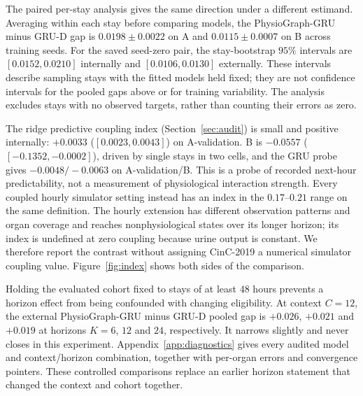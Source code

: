The paired per-stay analysis gives the same direction under a different estimand. Averaging within each stay before comparing models, the PhysioGraph-GRU minus GRU-D gap is $0.0198\pm0.0022$ on A and $0.0115\pm0.0007$ on B across training seeds. For the saved seed-zero pair, the stay-bootstrap $95\%$ intervals are $[0.0152,0.0210]$ internally and $[0.0106,0.0130]$ externally. These intervals describe sampling stays with the fitted models held fixed; they are not confidence intervals for the pooled gaps above or for training variability. The analysis excludes stays with no observed targets, rather than counting their errors as zero.


The ridge predictive coupling index (Section~\ref{sec:audit}) is small and positive internally: $+0.0033$ ($[0.0023,\allowbreak 0.0043]$) on A-validation. B is $-0.0557$ ($[-0.1352,\allowbreak -0.0002]$), driven by single stays in two cells, and the GRU probe gives $-0.0048/-0.0063$ on A-validation/B. This is a probe of recorded next-hour predictability, not a measurement of physiological interaction strength. Every coupled hourly simulator setting instead has an index in the $0.17$--$0.21$ range on the same definition. The hourly extension has different observation patterns and organ coverage and reaches nonphysiological states over its longer horizon; its index is undefined at zero coupling because urine output is constant. We therefore report the contrast without assigning CinC-2019 a numerical simulator coupling value. Figure~\ref{fig:index} shows both sides of the comparison.


Holding the evaluated cohort fixed to stays of at least $48$ hours prevents a horizon effect from being confounded with changing eligibility. At context $C=12$, the external PhysioGraph-GRU minus GRU-D pooled gap is $+0.026$, $+0.021$ and $+0.019$ at horizons $K=6$, $12$ and $24$, respectively. It narrows slightly and never closes in this experiment. Appendix~\ref{app:diagnostics} gives every audited model and context/horizon combination, together with per-organ errors and convergence pointers. These controlled comparisons replace an earlier horizon statement that changed the context and cohort together.


